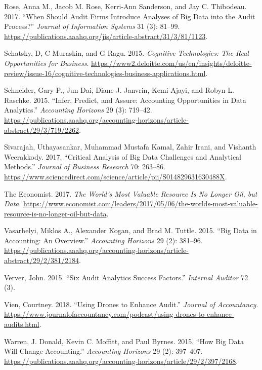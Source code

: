 \documentclass[
  letterpaper,
  DIV=11,
  numbers=noendperiod]{scrreprt}
\newlength{\cslhangindent}
\newenvironment{CSLReferences}[2] %
 {\begin{list}{}{%
  \setlength{\itemindent}{0pt}
  \setlength{\leftmargin}{0pt}
  \setlength{\parsep}{0pt}
  \ifodd #1
   \setlength{\leftmargin}{\cslhangindent}
   \setlength{\itemindent}{-1\cslhangindent}
  \fi
  \setlength{\itemsep}{#2\baselineskip}}}
 {\end{list}}
\begin{document}
\begin{CSLReferences}{1}{1}
Rose, Anna M., Jacob M. Rose, Kerri-Ann Sanderson, and Jay C. Thibodeau.
2017. {``When Should Audit Firms Introduce Analyses of Big Data into the
Audit Process?''} \emph{Journal of Information Systems} 31 (3): 81--99.
\url{https://publications.aaahq.org/jis/article-abstract/31/3/81/1123}.

Schatsky, D, C Muraskin, and G Ragu. 2015. \emph{Cognitive Technologies:
The Real Opportunities for Business}.
\url{https://www2.deloitte.com/us/en/insights/deloitte-review/issue-16/cognitive-technologies-business-applications.html}.

Schneider, Gary P., Jun Dai, Diane J. Janvrin, Kemi Ajayi, and Robyn L.
Raschke. 2015. {``Infer, Predict, and Assure: {Accounting} Opportunities
in Data Analytics.''} \emph{Accounting Horizons} 29 (3): 719--42.
\url{https://publications.aaahq.org/accounting-horizons/article-abstract/29/3/719/2262}.

Sivarajah, Uthayasankar, Muhammad Mustafa Kamal, Zahir Irani, and
Vishanth Weerakkody. 2017. {``Critical Analysis of {Big} {Data}
Challenges and Analytical Methods.''} \emph{Journal of Business
Research} 70: 263--86.
\url{https://www.sciencedirect.com/science/article/pii/S014829631630488X}.

The Economist. 2017. \emph{The World's Most Valuable Resource Is No
Longer Oil, but Data}.
\url{https://www.economist.com/leaders/2017/05/06/the-worlds-most-valuable-resource-is-no-longer-oil-but-data}.

Vasarhelyi, Miklos A., Alexander Kogan, and Brad M. Tuttle. 2015. {``Big
Data in Accounting: {An} Overview.''} \emph{Accounting Horizons} 29 (2):
381--96.
\url{https://publications.aaahq.org/accounting-horizons/article-abstract/29/2/381/2184}.

Verver, John. 2015. {``Six {Audit} {Analytics} {Success} {Factors}.''}
\emph{Internal Auditor} 72 (3).

Vien, Courtney. 2018. {``Using Drones to Enhance Audit.''} \emph{Journal
of Accountancy}.
\url{https://www.journalofaccountancy.com/podcast/using-drones-to-enhance-audits.html}.

Warren, J. Donald, Kevin C. Moffitt, and Paul Byrnes. 2015. {``How Big
Data Will Change Accounting.''} \emph{Accounting Horizons} 29 (2):
397--407.
\url{https://publications.aaahq.org/accounting-horizons/article/29/2/397/2168}.


\end{CSLReferences}
\end{document}
